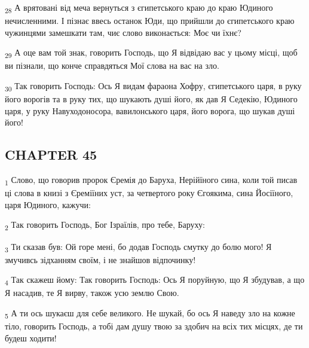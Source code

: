 \begin{tcolorbox}
\textsubscript{28} А врятовані від меча вернуться з єгипетського краю до краю Юдиного нечисленними. І пізнає ввесь останок Юди, що прийшли до єгипетського краю чужинцями замешкати там, чиє слово виконається: Моє чи їхнє?
\end{tcolorbox}
\begin{tcolorbox}
\textsubscript{29} А оце вам той знак, говорить Господь, що Я відвідаю вас у цьому місці, щоб ви пізнали, що конче справдяться Мої слова на вас на зло.
\end{tcolorbox}
\begin{tcolorbox}
\textsubscript{30} Так говорить Господь: Ось Я видам фараона Хофру, єгипетського царя, в руку його ворогів та в руку тих, що шукають душі його, як дав Я Седекію, Юдиного царя, у руку Навуходоносора, вавилонського царя, його ворога, що шукав душі його!
\end{tcolorbox}
\subsection{CHAPTER 45}
\begin{tcolorbox}
\textsubscript{1} Слово, що говорив пророк Єремія до Баруха, Нерійїного сина, коли той писав ці слова в книзі з Єреміїних уст, за четвертого року Єгоякима, сина Йосіїного, царя Юдиного, кажучи:
\end{tcolorbox}
\begin{tcolorbox}
\textsubscript{2} Так говорить Господь, Бог Ізраїлів, про тебе, Баруху:
\end{tcolorbox}
\begin{tcolorbox}
\textsubscript{3} Ти сказав був: Ой горе мені, бо додав Господь смутку до болю мого! Я змучивсь зідханням своїм, і не знайшов відпочинку!
\end{tcolorbox}
\begin{tcolorbox}
\textsubscript{4} Так скажеш йому: Так говорить Господь: Ось Я поруйную, що Я збудував, а що Я насадив, те Я вирву, також усю землю Свою.
\end{tcolorbox}
\begin{tcolorbox}
\textsubscript{5} А ти ось шукаєш для себе великого. Не шукай, бо ось Я наведу зло на кожне тіло, говорить Господь, а тобі дам душу твою за здобич на всіх тих місцях, де ти будеш ходити!
\end{tcolorbox}
